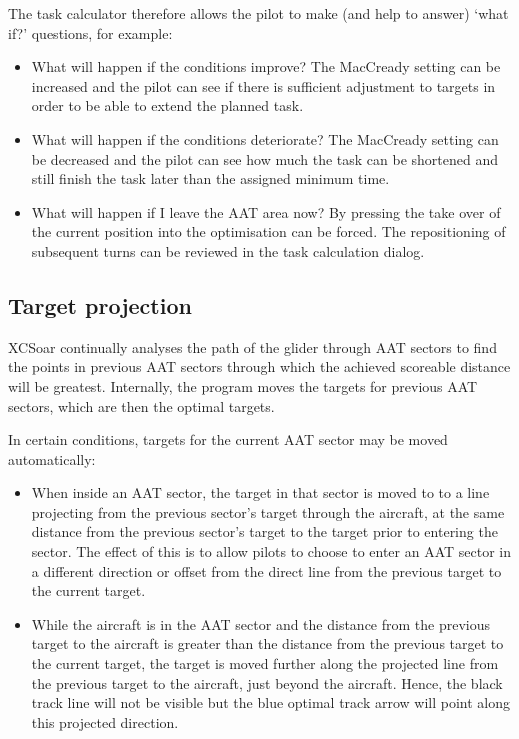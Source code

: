 \documentclass[a4paper,12pt]{refrep}
\begin{document}
The task calculator therefore allows the pilot to make (and help to
answer) `what if?' questions, for example:
\begin{itemize}
\item What will happen if the conditions improve?  The MacCready setting can be 
increased and the pilot can see if there is sufficient adjustment to targets in 
order to be able to extend the planned task.
\item What will happen if the conditions deteriorate?  The MacCready setting can 
be decreased and the pilot can see how much the task can be shortened and still 
finish the task later than the assigned minimum time.
\item What will happen if I leave the AAT area now?  By pressing  the take over of the current position into the optimisation can
be forced. The repositioning of subsequent turns can be reviewed in the task calculation
dialog.
\end{itemize}

\subsection*{Target projection}

XCSoar continually analyses the path of the glider through AAT sectors
to find the points in previous AAT sectors through which the achieved
scoreable distance will be greatest.  Internally, the program moves
the targets for previous AAT sectors, which are then the optimal
targets.

In certain conditions, targets for the current AAT sector may be moved
automatically:
\begin{itemize}
\item When inside an AAT sector, the target in that sector is moved to
to a line projecting from the previous sector's target through the
aircraft, at the same distance from the previous sector's target to
the target prior to entering the sector.  The effect of this is to
allow pilots to choose to enter an AAT sector in a different direction
or offset from the direct line from the previous target to the current
target.

\item While the aircraft is in the AAT sector and the distance from the
previous target to the aircraft is greater than the distance from the
previous target to the current target, the target is moved further
along the projected line from the previous target to the aircraft,
just beyond the aircraft.  Hence, the black track line will not be
visible but the blue optimal track arrow will point along this
projected direction.
\end{itemize}
\end{document}
